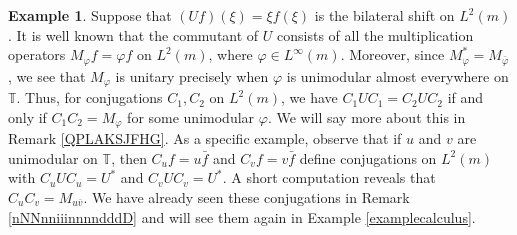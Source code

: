 \documentclass{dis}
\theoremstyle{plain}
\theoremstyle{definition}
\newtheorem{Example}[equation]{Example}
\def\T{\mathbb{T}}
\renewcommand{\phi}{\varphi}
\newcommand{\0}{{\color{lightgray}0}}
\begin{document}
\begin{Example}
Suppose that $(U f)(\xi) = \xi f(\xi)$ is the bilateral shift on $L^2(m)$. It is well  known \cite[p.~183]{MR4545809} that the commutant of $U$ consists of all the multiplication operators $M_{\phi} f = \phi f$ on $L^2(m)$, where $\phi \in L^{\infty}(m)$. Moreover, since $M_{\phi}^{*} = M_{\bar{\phi}}$, we see that $M_{\phi}$ is unitary precisely when $\phi$ is unimodular almost everywhere on $\T$. Thus, for conjugations $C_1, C_2$ on $L^2(m)$, we have $C_1 U C_1 = C_2 U C_2$ if and only if $C_1 C_2 = M_{\phi}$ for some unimodular $\phi$. We will say more about this in Remark \ref{QPLAKSJFHG}. As a specific example, observe that if $u$ and $v$ are unimodular on $\T$, then $C_{u} f = u \bar{f}$ and $C_{v} f = v \bar{f}$ define conjugations on $L^2(m)$ with $C_{u} U C_{u} = U^{*}$ and $C_{v} U C_{v} = U^{*}$. A short computation reveals  that $C_{u} C_{v} = M_{u \overline{v}}$. We have already seen these conjugations in Remark \ref{nNNnniiinnnndddD} and   will see them again in Example \ref{examplecalculus}.
\end{Example}
\end{document}
